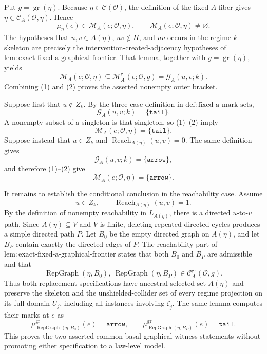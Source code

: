 Put \(g=\operatorname{gr}(\eta)\).  Because \(\eta\in\mathcal C(\mathcal O)\), the definition of the fixed-\(A\) fiber gives \(\eta\in\mathcal C_A(\mathcal O,\eta)\).  Hence
\[
 \mu_\eta(e)\in\mathcal M_A(e;\mathcal O,\eta),
 \qquad
 \mathcal M_A(e;\mathcal O,\eta)\ne\varnothing.
 \tag{1}
\]
The hypotheses that \(u,v\in A(\eta)\), \(uv\notin H\), and \(uv\) occurs in the regime-\(k\) skeleton are precisely the intervention-created-adjacency hypotheses of \(\mathrm{lem:exact\mbox{-}fixed\mbox{-}a\mbox{-}graphical\mbox{-}frontier}\).  That lemma, together with \(g=\operatorname{gr}(\eta)\), yields
\[
 \mathcal M_A(e;\mathcal O,\eta)
 \subseteq
 \mathcal M_A^{\mathrm{gr}}(e;\mathcal O,g)
 =\mathcal G_A(u,v;k).
 \tag{2}
\]
Combining (1) and (2) proves the asserted nonempty outer bracket.

Suppose first that \(u\notin Z_k\).  By the three-case definition in \(\mathrm{def:fixed\mbox{-}a\mbox{-}mark\mbox{-}sets}\),
\[
 \mathcal G_A(u,v;k)=\{\mathtt{tail}\}.
\]
A nonempty subset of a singleton is that singleton, so (1)--(2) imply
\[
 \mathcal M_A(e;\mathcal O,\eta)=\{\mathtt{tail}\}.
 \tag{3}
\]
Suppose instead that \(u\in Z_k\) and \(\operatorname{Reach}_{A(\eta)}(u,v)=0\).  The same definition gives
\[
 \mathcal G_A(u,v;k)=\{\mathtt{arrow}\},
\]
and therefore (1)--(2) give
\[
 \mathcal M_A(e;\mathcal O,\eta)=\{\mathtt{arrow}\}.
 \tag{4}
\]

It remains to establish the conditional conclusion in the reachability case.  Assume
\[
 u\in Z_k,
 \qquad
 \operatorname{Reach}_{A(\eta)}(u,v)=1.
 \tag{5}
\]
By the definition of nonempty reachability in \(L_{A(\eta)}\), there is a directed \(u\)-to-\(v\) path.  Since \(A(\eta)\subseteq V\) and \(V\) is finite, deleting repeated directed cycles produces a simple directed path \(P\).  Let \(B_0\) be the empty directed graph on \(A(\eta)\), and let \(B_P\) contain exactly the directed edges of \(P\).  The reachability part of \(\mathrm{lem:exact\mbox{-}fixed\mbox{-}a\mbox{-}graphical\mbox{-}frontier}\) states that both \(B_0\) and \(B_P\) are admissible and that
\[
 \operatorname{RepGraph}(\eta,B_0),\ 
 \operatorname{RepGraph}(\eta,B_P)
 \in\mathcal C_A^{\mathrm{gr}}(\mathcal O,g).
 \tag{6}
\]
Thus both replacement specifications have ancestral selected set \(A(\eta)\) and preserve the skeleton and the unshielded-collider set of every regime projection on its full domain \(U_j\), including all instances involving \(\zeta_j\).  The same lemma computes their marks at \(e\) as
\[
 \mu^{\mathrm{gr}}_{\operatorname{RepGraph}(\eta,B_0)}(e)
   =\mathtt{arrow},
 \qquad
 \mu^{\mathrm{gr}}_{\operatorname{RepGraph}(\eta,B_P)}(e)
   =\mathtt{tail}.
 \tag{7}
\]
This proves the two asserted common-basal graphical witness statements without promoting either specification to a law-level model.

